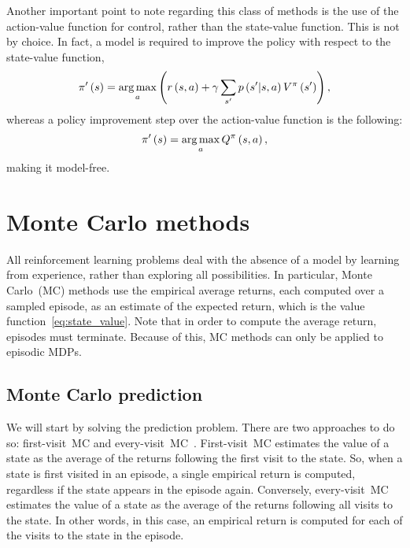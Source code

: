Another important point to note regarding this class of methods is the use of the action-value function for control, rather than the state-value function. This is not by choice. In fact, a model is required to improve the policy with respect to the state-value function,
\begin{equation}
	\policy'\left(\state\right)=\argmax_{\action}\left(\immediatereward\left(\state,\action\right)+\discount\sum_{\state'}\transition\left(\state'\middle\vert\state,\action\right)\statevalue\policyscript\left(\state'\right)\right),
\end{equation}
whereas a policy improvement step over the action-value function is the following:
\begin{equation}
	\policy'\left(\state\right)=\argmax_{\action}\actionvalue\policyscript\left(\state,\action\right),
\end{equation}
making it model-free.

\section{Monte Carlo methods}
All reinforcement learning problems deal with the absence of a model by learning from experience, rather than exploring all possibilities. In particular, Monte Carlo~(MC) methods use the empirical average returns, each computed over a sampled episode, as an estimate of the expected return, which is the value function~\eqref{eq:state_value}. Note that in order to compute the average return, episodes must terminate. Because of this, MC methods can only be applied to episodic MDPs.

\subsection{Monte Carlo prediction}
We will start by solving the prediction problem. There are two approaches to do so: first-visit~MC and every-visit~MC~{\cite{singhsutton1996}}. First-visit~MC estimates the value of a state as the average of the returns following the first visit to the state. So, when a state is first visited in an episode, a single empirical return is computed, regardless if the state appears in the episode again. Conversely, every-visit~MC estimates the value of a state as the average of the returns following all visits to the state. In other words, in this case, an empirical return is computed for each of the visits to the state in the episode.

